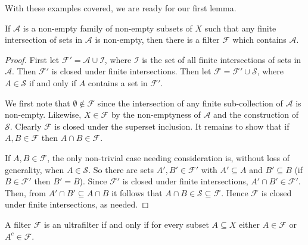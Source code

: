 With these examples covered, we are ready for our first lemma.

\begin{lemma}
\label{filter:1}
If \( \mathcal{A} \) is a non-empty family of non-empty subsets of \( X \) such that any finite intersection of sets in \( \mathcal{A} \) is non-empty, then there is a filter \( \mathcal{F} \) which contains \( \mathcal{A} \).
\end{lemma}
\begin{proof}
First let \( \mathcal{F}' = \mathcal{A} \cup \mathcal{I} \), where \( \mathcal{I} \) is the set of all finite intersections of sets in \( \mathcal{A} \). Then \( \mathcal{F'} \) is closed under finite intersections. Then let \( \mathcal{F} = \mathcal{F}' \cup \mathcal{S} \), where \( A \in \mathcal{S} \) if and only if \( A \) contains a set in \( \mathcal{F}' \).

We first note that \( \emptyset \notin \mathcal{F} \) since the intersection of any finite sub-collection of \(\mathcal{A} \) is non-empty. Likewise, \( X \in \mathcal{F} \) by the non-emptyness of \( \mathcal{A} \) and the construction of \( \mathcal{S} \). Clearly \( \mathcal{F} \) is closed under the superset inclusion. It remains to show that if \( A, B \in \mathcal{F} \) then \( A \cap B \in \mathcal{F} \). 

If \( A, B \in \mathcal{F} \), the only non-trivial case needing consideration is, without loss of generality, when \( A \in \mathcal{S} \). So there are sets \( A', B' \in \mathcal{F}' \) with \( A' \subseteq A \) and \( B' \subseteq B \) (if \( B \in \mathcal{F}' \) then \( B' = B \)). Since \( \mathcal{F} ' \) is closed under finite intersections, \( A' \cap B' \in \mathcal{F} ' \). Then, from \( A' \cap B' \subseteq A \cap B \) it follows that \( A \cap B \in \mathcal{S} \subseteq \mathcal{F} \). Hence \( \mathcal{F} \) is closed under finite intersections, as needed.
\end{proof}
\begin{lemma}
\label{filter:2}
A filter \( \mathcal{F} \) is an ultrafilter if and only if for every subset \( A \subseteq X \) either \( A \in \mathcal{F} \) or \( A^{c} \in \mathcal{F} \).
\end{lemma}
